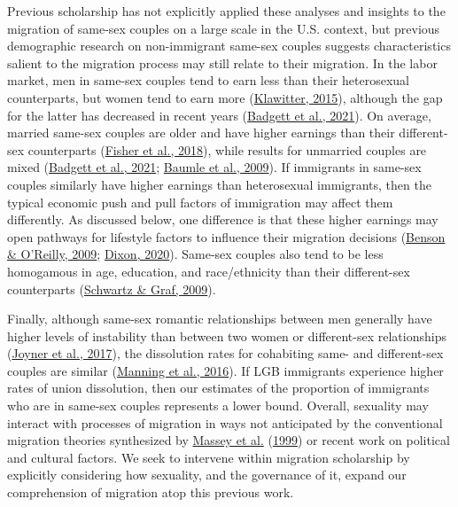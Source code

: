 \documentclass[
  12pt,
]{article}
\begin{document}
Previous scholarship has not explicitly applied these analyses and insights to the migration of same-sex couples on a large scale in the U.S. context, but previous demographic research on non-immigrant same-sex couples suggests characteristics salient to the migration process may still relate to their migration. In the labor market, men in same-sex couples tend to earn less than their heterosexual counterparts, but women tend to earn more (\protect\hyperlink{ref-klawitter_2015}{Klawitter, 2015}), although the gap for the latter has decreased in recent years (\protect\hyperlink{ref-badgett_2021_lgbtq}{Badgett et al., 2021}). On average, married same-sex couples are older and have higher earnings than their different-sex counterparts (\protect\hyperlink{ref-fisher_2018}{Fisher et al., 2018}), while results for unmarried couples are mixed (\protect\hyperlink{ref-badgett_2021_lgbtq}{Badgett et al., 2021}; \protect\hyperlink{ref-baumle_2009}{Baumle et al., 2009}). If immigrants in same-sex couples similarly have higher earnings than heterosexual immigrants, then the typical economic push and pull factors of immigration may affect them differently. As discussed below, one difference is that these higher earnings may open pathways for lifestyle factors to influence their migration decisions (\protect\hyperlink{ref-benson_2009}{Benson \& O'Reilly, 2009}; \protect\hyperlink{ref-dixon_2020}{Dixon, 2020}). Same-sex couples also tend to be less homogamous in age, education, and race/ethnicity than their different-sex counterparts (\protect\hyperlink{ref-schwartz_2009}{Schwartz \& Graf, 2009}).

Finally, although same-sex romantic relationships between men generally have higher levels of instability than between two women or different-sex relationships (\protect\hyperlink{ref-joyner_2017}{Joyner et al., 2017}), the dissolution rates for cohabiting same- and different-sex couples are similar (\protect\hyperlink{ref-manning_2016}{Manning et al., 2016}). If LGB immigrants experience higher rates of union dissolution, then our estimates of the proportion of immigrants who are in same-sex couples represents a lower bound. Overall, sexuality may interact with processes of migration in ways not anticipated by the conventional migration theories synthesized by \protect\hyperlink{ref-massey_1999}{Massey et al.} (\protect\hyperlink{ref-massey_1999}{1999}) or recent work on political and cultural factors. We seek to intervene within migration scholarship by explicitly considering how sexuality, and the governance of it, expand our comprehension of migration atop this previous work.
\end{document}
